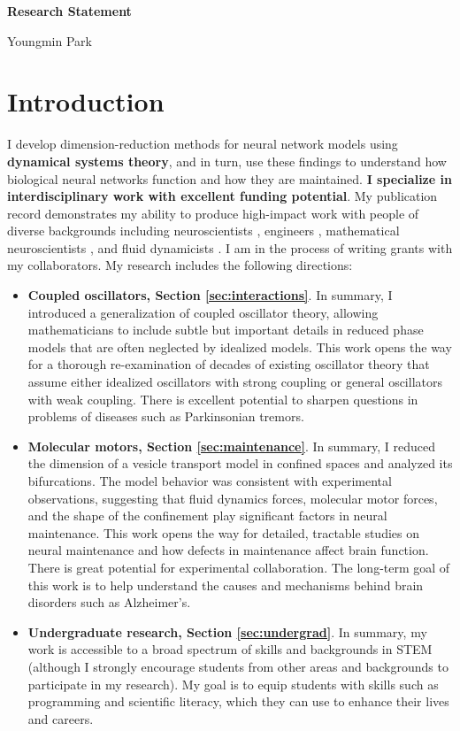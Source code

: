 \documentclass[a4paper,11pt]{article}
\begin{document}
\begin{center}
\Large \textbf{Research Statement}

\Large Youngmin Park
\end{center}


\section{Introduction}

I develop dimension-reduction methods for neural network models using \textbf{dynamical systems theory}, and in turn, use these findings to understand how biological neural networks function and how they are maintained. \textbf{I specialize in interdisciplinary work with excellent funding potential}. My publication record demonstrates my ability to produce high-impact work with people of diverse backgrounds including neuroscientists \cite{park2020circuit}, engineers \cite{ermentrout2019recent,park2020high}, mathematical neuroscientists \cite{park2016weakly,park2018infinitesimal,park2018multiple,park2018scalar}, and fluid dynamicists \cite{park2020dynamics}. I am in the process of writing grants with my collaborators. My research includes the following directions:
\begin{itemize}
	\item \textbf{Coupled oscillators, Section \ref{sec:interactions}}. In summary, I introduced a generalization of coupled oscillator theory, allowing mathematicians to include subtle but important details in reduced phase models that are often neglected by idealized models. This work opens the way for a thorough re-examination of decades of existing oscillator theory that assume either idealized oscillators with strong coupling or general oscillators with weak coupling. There is excellent potential to sharpen questions in problems of diseases such as Parkinsonian tremors.
	\item \textbf{Molecular motors, Section \ref{sec:maintenance}}. In summary, I reduced the dimension of a vesicle transport model in confined spaces and analyzed its bifurcations. The model behavior was consistent with experimental observations, suggesting that fluid dynamics forces, molecular motor forces, and the shape of the confinement play significant factors in neural maintenance. This work opens the way for detailed, tractable studies on neural maintenance and how defects in maintenance affect brain function. There is great potential for experimental collaboration. The long-term goal of this work is to help understand the causes and mechanisms behind  brain disorders such as Alzheimer's.
	\item \textbf{Undergraduate research, Section \ref{sec:undergrad}}. In summary, my work is accessible to a broad spectrum of skills and backgrounds in STEM (although I strongly encourage students from other areas and backgrounds to participate in my research). My goal is to equip students with skills such as programming and scientific literacy, which they can use to enhance their lives and careers.
\end{itemize}
\end{document}
